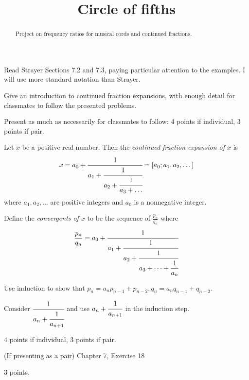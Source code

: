 \documentclass[letterpaper, 11 pt,handout,hints]{ximera}
\title{Circle of fifths}
\begin{document}
\begin{abstract}
 Project on frequency ratios for musical cords and continued fractions.
\end{abstract}
\maketitle

Read Strayer Sections 7.2 and 7.3, paying particular attention to the examples. I will use more standard notation than Strayer.

\begin{exploration}
 Give an introduction to continued fraction expansions, with enough detail for classmates to follow the presented problems.

\begin{rubric}
 Present as much as necessarily for classmates to follow: 4 points if individual, 3 points if pair.
\end{rubric}
 
\begin{definition}
 Let $x$ be a positive real number. Then the \emph{continued fraction expansion of $x$} is \[x=a_0+\cfrac{1}{a_1+\cfrac{1}{a_2+\cfrac{1}{a_3+\dots}}}=[a_0;a_1,a_2,\dots]\]
 where $a_1,a_2,\dots$ are positive integers and $a_0$ is a nonnegative integer. 
 
Define the \emph{convergents of $x$} to be the sequence of $\frac{p_n}{q_n}$ where \[\frac{p_n}{q_n}=a_0+\cfrac{1}{a_1+\cfrac{1}{a_2+\cfrac{1}{a_3+\dots+\cfrac{1}{a_n}}}}\]

\begin{problem}
	Use induction to show that $p_{n}=a_n p_{n-1} +p_{n-2}, q_{n}=a_n q_{n-1} +q_{n-2}.$ 
\begin{hint}
 Consider $\cfrac{1}{a_n+\cfrac{1}{a_{n+1}}}$ and use $a_n+\cfrac{1}{a_{n+1}}$ in the induction step.
\end{hint}
\begin{rubric}
4 points if individual, 3 points if pair.
\end{rubric}
\end{problem}

\begin{problem}(If presenting as a pair)
 Chapter 7, Exercise 18
 \begin{rubric}
3 points.
\end{rubric}
\end{problem}
\end{definition}
\end{exploration}
\end{document}

